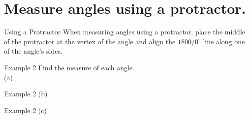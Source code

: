 \documentclass[t]{beamer}
\begin{document}
\section{Measure angles using a protractor.}

\begin{frame}{Using a Protractor}
When measuring angles using a protractor, place the middle of the protractor at the vertex of the angle and align the $1800/0^\circ$ line along one of the angle's sides.

\end{frame}

\begin{frame}{Example 2}
Find the measure of each angle.	\newline\\
(a)	\quad	\onslide<3->{{$\color{red}\mathbf{90^\circ}$}}
\begin{center}
\end{center}
\end{frame}

\begin{frame}{Example 2}
(b)	\quad	\onslide<3->{{$\color{red}\mathbf{120^\circ}$}}
\begin{center}
\end{center}
\end{frame}

\begin{frame}{Example 2}
(c)	\quad	\onslide<3->{{$\color{red}\mathbf{75^\circ}$}}
\begin{center}
\end{center}
\end{frame}
\end{document}

